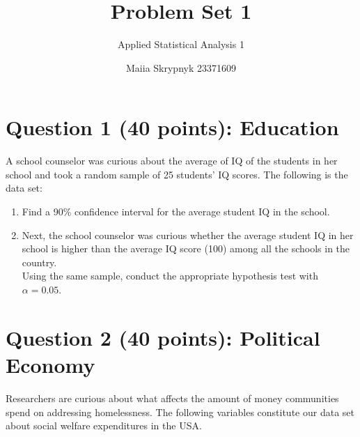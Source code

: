 \documentclass[12pt,letterpaper]{article}
\title{Problem Set 1}
\date{Maiia Skrypnyk 23371609}
\author{Applied Statistical Analysis 1}
\begin{document}
	\maketitle

	\section*{Question 1 (40 points): Education}

A school counselor was curious about the average of IQ of the students in her school and took a random sample of 25 students' IQ scores. The following is the data set:\\

  
\vspace{.5cm}

\begin{enumerate}
	\item Find a 90\% confidence interval for the average student IQ in the school.

  
\vspace{.2cm}

	\item Next, the school counselor was curious  whether  the average student IQ in her school is higher than the average IQ score (100) among all the schools in the country.\\ 
	
	\noindent Using the same sample, conduct the appropriate hypothesis test with $\alpha=0.05$.
	
	  
	\vspace{.2cm}
\end{enumerate}

\newpage

	\section*{Question 2 (40 points): Political Economy}

\noindent Researchers are curious about what affects the amount of money communities spend on addressing homelessness. The following variables constitute our data set about social welfare expenditures in the USA. \\
\vspace{.5cm}
\end{document}
